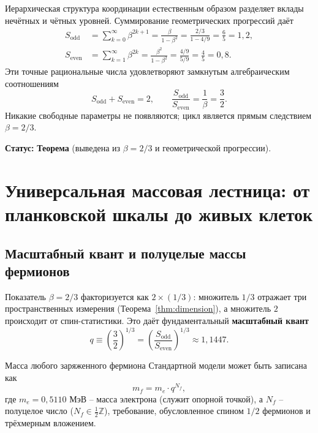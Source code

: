 \documentclass[12pt,a4paper]{article}
\begin{document}
	Иерархическая структура координации естественным образом разделяет вклады нечётных и чётных уровней. Суммирование геометрических прогрессий даёт
	\begin{align}
		S_{\mathrm{odd}} &= \sum_{k=0}^{\infty} \beta^{2k+1} = \frac{\beta}{1-\beta^{2}} = \frac{2/3}{1 - 4/9} = \frac{6}{5} = 1,2, \label{eq:sodd}\\
		S_{\mathrm{even}} &= \sum_{k=1}^{\infty} \beta^{2k} = \frac{\beta^{2}}{1-\beta^{2}} = \frac{4/9}{5/9} = \frac{4}{5} = 0,8. \label{eq:seven}
	\end{align}
	Эти точные рациональные числа удовлетворяют замкнутым алгебраическим соотношениям
	\begin{equation}
		\boxed{S_{\mathrm{odd}} + S_{\mathrm{even}} = 2, \qquad \frac{S_{\mathrm{odd}}}{S_{\mathrm{even}}} = \frac{1}{\beta} = \frac{3}{2}}.
		\label{eq:algebraic-loop}
	\end{equation}
	Никакие свободные параметры не появляются; цикл является прямым следствием \(\beta = 2/3\).
	
	\textbf{Статус:} \textbf{Теорема} (выведена из \(\beta = 2/3\) и геометрической прогрессии).
	
	\section{Универсальная массовая лестница: от планковской шкалы до живых клеток}
	\label{sec:mass-ladder}
	
	\subsection{Масштабный квант и полуцелые массы фермионов}
	
	Показатель \(\beta = 2/3\) факторизуется как \(2 \times (1/3)\): множитель \(1/3\) отражает три пространственных измерения (Теорема~\ref{thm:dimension}), а множитель \(2\) происходит от спин-статистики. Это даёт фундаментальный \textbf{масштабный квант}
	\begin{equation}
		q \equiv \left(\frac{3}{2}\right)^{1/3} = \left(\frac{S_{\mathrm{odd}}}{S_{\mathrm{even}}}\right)^{1/3} \approx 1,1447.
	\end{equation}
	
	Масса любого заряженного фермиона Стандартной модели может быть записана как
	\begin{equation}
		\boxed{m_f = m_e \cdot q^{N_f}},
		\label{eq:mass-quantization}
	\end{equation}
	где \(m_e = 0,5110\) МэВ – масса электрона (служит опорной точкой), а \(N_f\) – полуцелое число (\(N_f \in \frac{1}{2}\mathbb{Z}\)), требование, обусловленное спином \(1/2\) фермионов и трёхмерным вложением.
	
\end{document}
